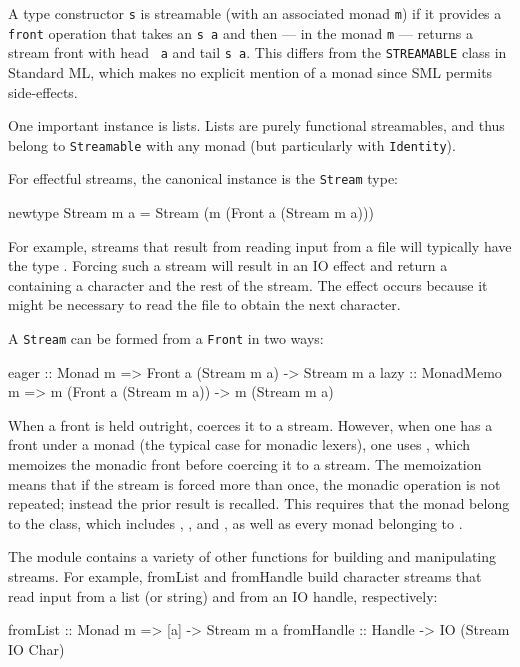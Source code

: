 \documentclass[10pt]{article}
\begin{document}
\begin{strictcode}
A type constructor {\tt s} is streamable (with an associated monad
{\tt m}) if it provides a {\tt front} operation that takes an {\tt s
a} and then --- in the monad {\tt m} --- returns a stream front with head {\tt
a} and tail {\tt s a}.  This differs from the {\tt STREAMABLE} class
in Standard ML, which makes no explicit mention of a monad since SML
permits side-effects.

One important instance is lists.  Lists are purely functional
streamables, and thus belong to {\tt Streamable} with any monad (but
particularly with {\tt Identity}).

For effectful streams, the canonical instance is the {\tt Stream} type:

\begin{code}
newtype Stream m a =
   Stream (m (Front a (Stream m a)))
\end{code}

For example, streams that result from reading input from a file will
typically have the type .  Forcing such a stream
will result in an IO effect and return a  containing a
character and the rest of the stream.  The effect occurs because it
might be necessary to read the file to obtain the next character.

A {\tt Stream} can be formed from a {\tt Front} in two ways:

\begin{code}
eager :: Monad m => Front a (Stream m a) -> Stream m a
lazy  :: MonadMemo m => m (Front a (Stream m a)) -> m (Stream m a)
\end{code}

When a front is held outright,  coerces it to a stream.
However, when one has a front under a monad (the typical case for
monadic lexers), one uses , which memoizes the monadic front
before coercing it to a stream.  The memoization means that if the
stream is forced more than once, the monadic operation is not
repeated; instead the prior result is recalled.  This requires that
the monad belong to the  class, which includes
, , and , as well as every monad belonging
to .

The  module contains a variety of other functions for
building and manipulating streams.  For example, fromList and
fromHandle build character streams that read input from a list (or
string) and from an IO handle, respectively:

\begin{code}
fromList :: Monad m => [a] -> Stream m a
fromHandle :: Handle -> IO (Stream IO Char)
\end{code}




\end{strictcode}
\end{document}
